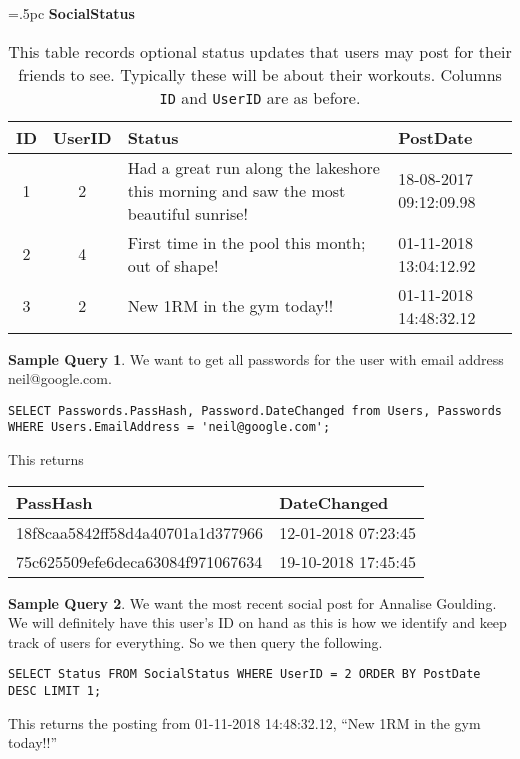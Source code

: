 \documentclass{article}
\theoremstyle{definition}
\newtheorem{query}{Sample Query}
\begin{document}
\begin{sidewaystable}[h]
	\centering
	\tabcolsep=.5pc
	{\bf SocialStatus}
	
	\begin{tabular}{ccp{3in}l} \hline 
		ID & UserID & Status & PostDate \\ \hline  
		1 & 2 & Had a great run along the lakeshore this morning and saw the most beautiful sunrise! & 18-08-2017 09:12:09.98 \\
		2 & 4 & First time in the pool this month; out of shape! & 01-11-2018 13:04:12.92 \\ 
		3 & 2 & New 1RM in the gym today!! & 01-11-2018 14:48:32.12 \\
		\hline 
	\end{tabular}
	\caption{\label{tab:social}
		This table records optional status updates that users may post for their friends to see. Typically these will be about their workouts. Columns {\tt ID} and {\tt UserID} are as before.
	}
\end{sidewaystable}



\begin{query}
	We want to get all passwords for the user with email address neil@google.com.
	\begin{lstlisting}[gobble=8]
	SELECT Passwords.PassHash, Password.DateChanged from Users, Passwords WHERE Users.EmailAddress = 'neil@google.com';
	\end{lstlisting}
	This returns
	\begin{center}
		\begin{tabular}{ll} \hline 
			PassHash & DateChanged \\ \hline 
			18f8caa5842ff58d4a40701a1d377966 & 12-01-2018 07:23:45 \\
			75c625509efe6deca63084f971067634 & 19-10-2018 17:45:45 \\ 
			\hline 
		\end{tabular}
	\end{center}
\end{query}

\begin{query}
	We want the most recent social post for Annalise Goulding. We will definitely have this user's ID on hand as this is how we identify and keep track of users for everything. So we then query the following.
	\begin{lstlisting}[gobble=8]
	SELECT Status FROM SocialStatus WHERE UserID = 2 ORDER BY PostDate DESC LIMIT 1;
	\end{lstlisting}
	This returns the posting from 01-11-2018 14:48:32.12, ``New 1RM in the gym today!!''
\end{query}
\end{document}
